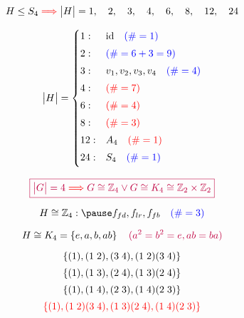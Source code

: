\begin{frame}{}
  \[
	H \le S_4 \textcolor{red}{\implies} \big\lvert H \big\rvert = 1,\quad 2,\quad 3,\quad 4,\quad 6,\quad 8,\quad 12,\quad 24
  \]

  \[
	\big\lvert H \big\rvert = \begin{cases}
	  1: & \text{id} \quad \textcolor{blue}{(\# = 1)} \\[3pt]
	  2: & \textcolor{blue}{(\# = 6 + 3 = 9)} \\[3pt]
	  3: & v_1, v_2, v_3, v_4 \quad \textcolor{blue}{(\# = 4)} \\[3pt]
	  4: & \textcolor{red}{(\# = 7)} \\[3pt]
	  6: & \textcolor{red}{(\# = 4)} \\[3pt]
	  8: & \textcolor{red}{(\# = 3)} \\[3pt]
	  12: & A_4 \quad \textcolor{red}{(\# = 1)} \\[3pt]
	  24: & S_4 \quad \textcolor{blue}{(\# = 1)} \\[3pt]
	\end{cases}
  \]
\end{frame}
\begin{frame}{}
  \[
	\textcolor{purple}{\boxed{\big\lvert G \big\rvert = 4 \textcolor{red}{\implies} G \cong \mathbb{Z}_{4} \lor G \cong K_4 \cong \mathbb{Z}_{2} \times \mathbb{Z}_{2}}}
  \]

  \pause
  \[
	H \cong \z_{4}: \pause f_{fd}, f_{lr}, f_{fb} \quad \blue{(\# = 3)}
  \]

  \pause
  \vspace{-0.80cm}
  \[
	H \cong K_{4} = \left\{ e, a, b, ab \right\} \quad \textcolor{purple}{(a^2 = b^2 = e, ab = ba)}
  \]

  \pause
  \vspace{-0.50cm}

  \pause
  \vspace{-0.60cm}
  \[ 
  	\left\{ (1), (1\; 2), (3\; 4), (1\; 2) (3\; 4) \right\} 
  \]
  \[ 
  	\left\{ (1), (1\; 3), (2\; 4), (1\; 3) (2\; 4) \right\} 
  \]
  \[ 
  	\left\{ (1), (1\; 4), (2\; 3), (1\; 4) (2\; 3) \right\} 
  \]
  \pause
  \vspace{-0.40cm}
  \[ 
  	\textcolor{red}{\left\{ (1), (1\; 2) (3\; 4), (1\; 3) (2\; 4), (1\; 4) (2\; 3) \right\}} 
  \]
\end{frame}
